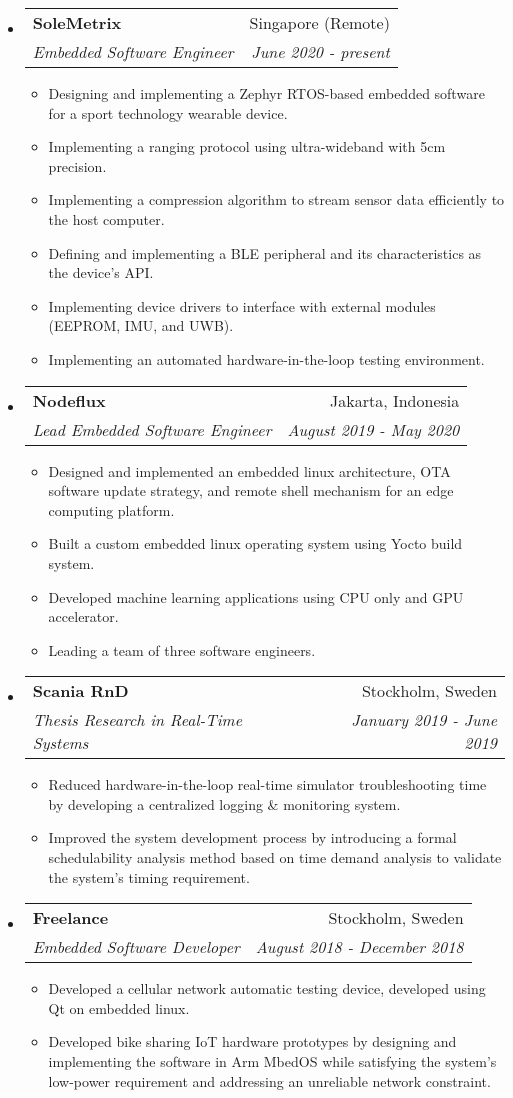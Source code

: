 \documentclass[letterpaper,9pt]{article}
\makeatletter
\newcommand{\resitem}[1]{\item #1 \vspace{-2pt}}
\newcommand{\ressubheading}[4]{
\begin{tabular*}{7.0in}{l@{\cftdotfill{\cftsecdotsep}\extracolsep{\fill}}r}
		\textbf{#1} & #2 \\
        \textit{#3} & \textit{#4} \\
\end{tabular*}\vspace{-6.3pt}}
\makeatother
\begin{document}
\begin{itemize}
  
  \item
        \ressubheading{SoleMetrix}{Singapore (Remote)}{Embedded Software Engineer}{June 2020 - present}
        \begin{itemize}
          \resitem{Designing and implementing a Zephyr RTOS-based embedded software for a sport technology wearable device.}
          \resitem{Implementing a ranging protocol using ultra-wideband with 5cm precision.}
          \resitem{Implementing a compression algorithm to stream sensor data efficiently to the host computer.}
          \resitem{Defining and implementing a BLE peripheral and its characteristics as the device's API.}
          \resitem{Implementing device drivers to interface with external modules (EEPROM, IMU, and UWB).}
          \resitem{Implementing an automated hardware-in-the-loop testing environment.}
        \end{itemize}

  \item
        \ressubheading{Nodeflux}{Jakarta, Indonesia}{Lead Embedded Software Engineer}{August 2019 - May 2020}
        \begin{itemize}
          \resitem{Designed and implemented an embedded linux architecture, OTA software update strategy, and remote shell mechanism for an edge computing platform.}
          \resitem{Built a custom embedded linux operating system using Yocto build system.}
          \resitem{Developed machine learning applications using CPU only and GPU accelerator.}
          \resitem{Leading a team of three software engineers.}
        \end{itemize}

  \item
        \ressubheading{Scania RnD}{Stockholm, Sweden}{Thesis Research in Real-Time Systems}{January 2019 - June 2019}
        \begin{itemize}
          \resitem{Reduced hardware-in-the-loop real-time simulator troubleshooting time by developing a centralized logging \& monitoring system.}
          \resitem{Improved the system development process by introducing a formal schedulability analysis method based on time demand analysis to validate the system's timing requirement.}
        \end{itemize}

  \item
        \ressubheading{Freelance}{Stockholm, Sweden}{Embedded Software Developer}{August 2018 - December 2018}
        \begin{itemize}
          \resitem{Developed a cellular network automatic testing device, developed using Qt on embedded linux.}
          \resitem{Developed bike sharing IoT hardware prototypes by designing and implementing the software in Arm MbedOS while satisfying the system's low-power requirement and addressing an unreliable network constraint.}
        \end{itemize}


\end{itemize}
\end{document}
